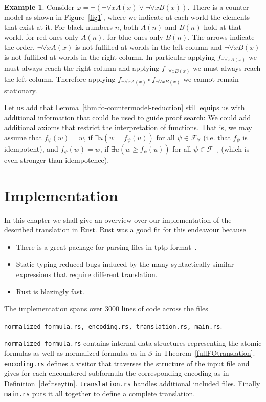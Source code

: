 \documentclass[a4paper,11pt]{report}
\theoremstyle{definition}
\theoremstyle{definition}
\theoremstyle{definition}
\theoremstyle{definition}
\theoremstyle{definition}
\theoremstyle{definition}
\newtheorem{example}[theorem]{Example}
\theoremstyle{definition}
\begin{document}
	
	\begin{example}
		Consider $\varphi = \neg(\neg \forall xA(x)\vee\neg \forall xB(x))$. There is a counter-model as shown in Figure~\ref{fig1},
		where we indicate at each world the elements that exist at it. For black numbers $n$, both $A(n)$ and $B(n)$ hold at that world, for red ones only $A(n)$, for blue ones only $B(n)$. The arrows indicate the order. $\neg\forall xA(x)$ is not fulfilled at worlds in the left column and $\neg\forall xB(x)$ is not fulfilled at worlds in the right column. In particular applying $f_{\neg \forall xA(x)}$ we must always reach the right column and applying $f_{\neg \forall xB(x)}$ we must always reach the left column. Therefore applying $f_{\neg \forall xA(x)}\circ f_{\neg \forall xB(x)}$ we cannot remain stationary.
	\end{example}
	
	Let us add that Lemma~\ref{thm:fo-countermodel-reduction} still equips us with additional information that could be used to guide proof search: We could add additional axioms that restrict the interpretation of functions. That is, we may assume that $f_\psi(w) = w$, if $\exists u(w = f_\psi(u))$ for all $\psi\in\mathcal F_\forall$ (i.e. that $f_\psi$ is idempotent), and $f_\psi(w) = w$, if $\exists u(w \geq f_\psi(u))$ for all $\psi\in\mathcal F_\to$ (which is even stronger than idempotence).
	
	\chapter{Implementation}
	
	In this chapter we shall give an overview over our implementation of the described translation in Rust. Rust was a good fit for this endeavour because
	\begin{itemize}
		\item There is a great package for parsing files in tptp format~\cite{rust-tptp}.
		\item Static typing reduced bugs induced by the many syntactically similar expressions that require different translation.
		\item Rust is blazingly fast.
	\end{itemize}
	The implementation spans over 3000 lines of code across the files 
	\begin{center}\lstinline|normalized_formula.rs, encoding.rs, translation.rs, main.rs|.\end{center}
	\lstinline|normalized_formula.rs| contains internal data structures representing the atomic formulas as well as normalized formulas as in $\mathcal S$ in Theorem~\ref{fullFOtranslation}. \lstinline|encoding.rs| defines a visitor that traverses the structure of the input file and gives for each encountered subformula the corresponding encoding as in Definition~\ref{def:tseytin}. \lstinline|translation.rs| handles additional included files. Finally \lstinline|main.rs| puts it all together to define a complete translation.
	
\end{document}
